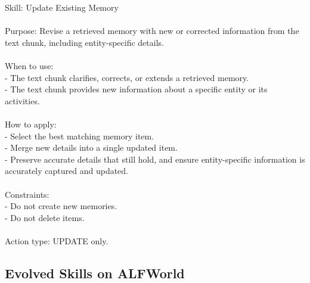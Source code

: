 \begin{center}
\begin{tcolorbox}[
  title={Evolved Skill on LoCoMo - UPDATE},
  colback=blue!2!white,
  colframe=blue!35!black,
  colbacktitle=blue!15!white,
  coltitle=black,
  coltext=black
]
{
Skill: Update Existing Memory \\\\
Purpose: Revise a retrieved memory with new or corrected information from the text chunk, including entity-specific details. \\\\
When to use: \\
- The text chunk clarifies, corrects, or extends a retrieved memory. \\
- The text chunk provides new information about a specific entity or its activities. \\\\
How to apply: \\
- Select the best matching memory item. \\
- Merge new details into a single updated item. \\
- Preserve accurate details that still hold, and ensure entity-specific information is accurately captured and updated. \\\\
Constraints: \\
- Do not create new memories. \\
- Do not delete items. \\\\
Action type: UPDATE only.
}
\label{appendix:case_update}
\end{tcolorbox}
\end{center}












\subsection{Evolved Skills on ALFWorld}


